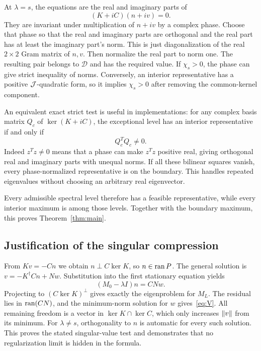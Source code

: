 At $\lambda=s$, the equations are the real and imaginary parts of
\begin{equation}
 (K+iC)(n+iv)=0.
 \label{eq:complexkernel}
\end{equation}
They are invariant under multiplication of $n+iv$ by a complex phase. Choose that phase so that the real and imaginary parts are orthogonal and the real part has at least the imaginary part's norm. This is just diagonalization of the real $2\times2$ Gram matrix of $n,v$. Then normalize the real part to norm one. The resulting pair belongs to $\mathcal D$ and has the required value. If $\chi_s>0$, the phase can give strict inequality of norms. Conversely, an interior representative has a positive $\mathcal J$-quadratic form, so it implies $\chi_s>0$ after removing the common-kernel component.

An equivalent exact strict test is useful in implementations: for any complex basis matrix $Q_c$ of $\ker(K+iC)$, the exceptional level has an interior representative if and only if
\begin{equation}
 Q_c^TQ_c\ne0.
 \label{eq:nonisotropic}
\end{equation}
Indeed $z^Tz\ne0$ means that a phase can make $z^Tz$ positive real, giving orthogonal real and imaginary parts with unequal norms. If all these bilinear squares vanish, every phase-normalized representative is on the boundary. This handles repeated eigenvalues without choosing an arbitrary real eigenvector.

Every admissible spectral level therefore has a feasible representative, while every interior maximum is among those levels. Together with the boundary maximum, this proves Theorem~\ref{thm:main}.

\subsection{Justification of the singular compression}
From $Kv=-Cn$ we obtain $n\perp C\ker K$, so $n\in\operatorname{ran} P$. The general solution is
$v=-K^\dagger Cn+Nw$. Substitution into the first stationary equation yields
\begin{equation}
 (M_0-\lambda I)n=CNw.
\end{equation}
Projecting to $(C\ker K)^\perp$ gives exactly the eigenproblem for $M_L$. The residual lies in $\operatorname{ran}(CN)$, and the minimum-norm solution for $w$ gives~\eqref{eq:V}. All remaining freedom is a vector in $\ker K\cap\ker C$, which only increases $\left\lVert v\right\rVert$ from its minimum. For $\lambda\ne s$, orthogonality to $n$ is automatic for every such solution. This proves the stated singular-value test and demonstrates that no regularization limit is hidden in the formula.
